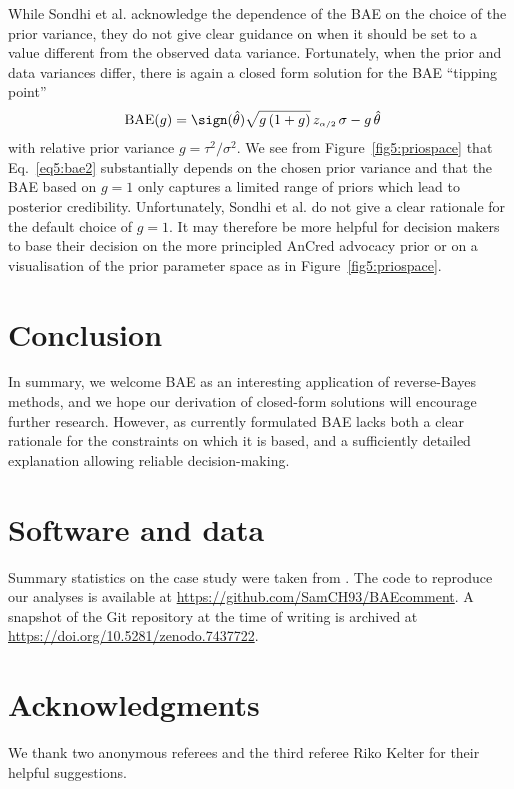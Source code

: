 While Sondhi et al. acknowledge the dependence of the BAE on the choice of the
prior variance, they do not give clear guidance on when it should be set to a
value different from the observed data variance. Fortunately, when the prior and
data variances differ, there is again a closed form solution for the BAE
``tipping point''
\begin{align}
  \text{BAE}(g)
  & =  \sign(\hat{\theta}) \sqrt{g \, (1 + g)} \, z_{\scriptscriptstyle \alpha/2} \, \sigma
    - g \, \hat{\theta}
    \label{eq5:bae2}
\end{align}
with relative prior variance $g = \tau^{2}/\sigma^{2}$. We see from
Figure~\ref{fig5:priospace} that Eq.~\eqref{eq5:bae2} substantially depends on the
chosen prior variance and that the BAE based on $g = 1$ only captures a limited
range of priors which lead to posterior credibility. Unfortunately, Sondhi et
al. do not give a clear rationale for the default choice of $g = 1$. It may
therefore be more helpful for decision makers to base their decision on the more
principled AnCred advocacy prior or on a visualisation of the prior parameter
space as in Figure~\ref{fig5:priospace}.

\section{Conclusion}
In summary, we welcome BAE as an interesting application of reverse-Bayes
methods, and we hope our derivation of closed-form solutions will encourage
further research. However, as currently formulated BAE lacks both a clear
rationale for the constraints on which it is based, and a sufficiently detailed
explanation allowing reliable decision-making.

\section*{Software and data}
Summary statistics on the case study were taken from \citet{Sondhi2021}. The
code to reproduce our analyses is available at
\url{https://github.com/SamCH93/BAEcomment}. A snapshot of the Git repository at
the time of writing is archived at \url{https://doi.org/10.5281/zenodo.7437722}.

\section*{Acknowledgments}
We thank two anonymous referees and the third referee Riko Kelter for their
helpful suggestions.%



